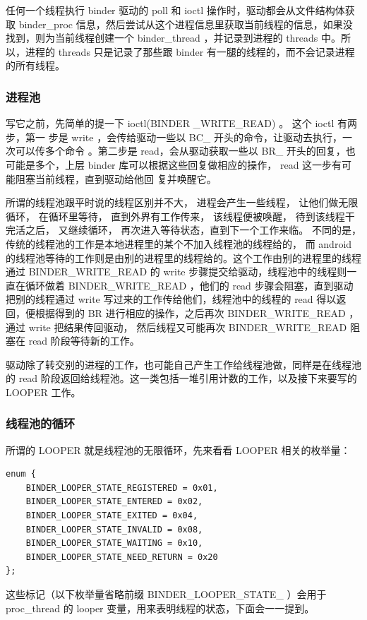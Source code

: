 \documentclass[a4paper,11pt]{article}
\begin{document}
任何一个线程执行 binder 驱动的 poll 和 ioctl 操作时，驱动都会从文件结构体获取
binder_proc 信息，然后尝试从这个进程信息里获取当前线程的信息，如果没找到，则为当前线程创建一个
binder_thread ，并记录到进程的 threads 中。所以，进程的 threads
只是记录了那些跟 binder 有一腿的线程的，而不会记录进程的所有线程。

\subsubsection{进程池}
写它之前，先简单的提一下 ioctl(BINDER _WRITE_READ) 。 这个 ioctl 有两步，第一
步是 write ，会传给驱动一些以 BC_ 开头的命令，让驱动去执行，一次可以传多个命令
。第二步是 read，会从驱动获取一些以 BR_ 开头的回复，也可能是多个，上层 binder
库可以根据这些回复做相应的操作， read 这一步有可能阻塞当前线程，直到驱动给他回
复并唤醒它。

所谓的线程池跟平时说的线程区别并不大， 进程会产生一些线程， 让他们做无限循环，
在循环里等待， 直到外界有工作传来， 该线程便被唤醒， 待到该线程干完活之后，
又继续循环， 再次进入等待状态，直到下一个工作来临。 不同的是，
传统的线程池的工作是本地进程里的某个不加入线程池的线程给的， 而 android
的线程池等待的工作则是由别的进程里的线程给的。这个工作由别的进程里的线程通过
BINDER_WRITE_READ 的 write 步骤提交给驱动，线程池中的线程则一直在循环做着
BINDER_WRITE_READ ，他们的 read 步骤会阻塞，直到驱动把别的线程通过 write
写过来的工作传给他们，线程池中的线程的 read 得以返回，便根据得到的 BR
进行相应的操作，之后再次 BINDER_WRITE_READ ，通过 write 把结果传回驱动，
然后线程又可能再次 BINDER_WRITE_READ 阻塞在 read 阶段等待新的工作。

驱动除了转交别的进程的工作，也可能自己产生工作给线程池做，同样是在线程池的 read
阶段返回给线程池。这一类包括一堆引用计数的工作，以及接下来要写的 LOOPER 工作。

\subsubsection{线程池的循环}\label{protocol:threadpool}
所谓的 LOOPER 就是线程池的无限循环，先来看看 LOOPER 相关的枚举量：
\begin{lstlisting}[multicols=2,caption=Binder Looper state]
enum {
    BINDER_LOOPER_STATE_REGISTERED = 0x01,
    BINDER_LOOPER_STATE_ENTERED = 0x02,
    BINDER_LOOPER_STATE_EXITED = 0x04,
    BINDER_LOOPER_STATE_INVALID = 0x08,
    BINDER_LOOPER_STATE_WAITING = 0x10,
    BINDER_LOOPER_STATE_NEED_RETURN = 0x20
};
\end{lstlisting}

这些标记（以下枚举量省略前缀 BINDER_LOOPER_STATE_ ）会用于 proc_thread 的
looper 变量，用来表明线程的状态，下面会一一提到。
\end{document}
